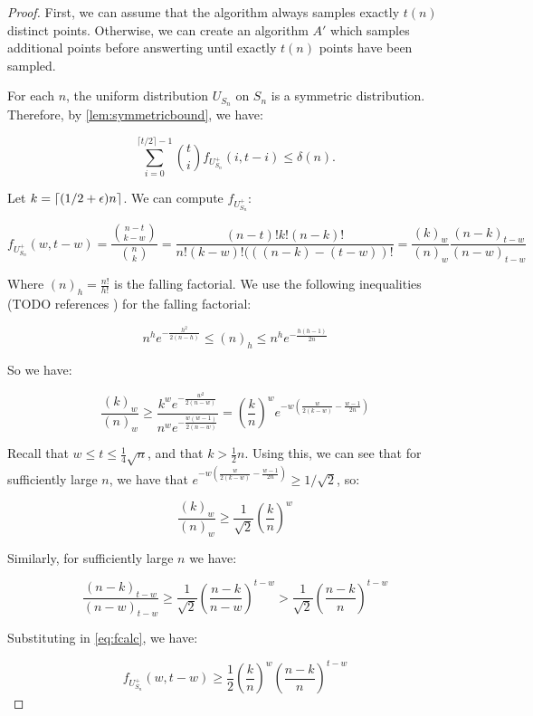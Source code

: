 \begin{proof}

First, we can assume that the algorithm always samples exactly $t(n)$ distinct points. Otherwise,
we can create an algorithm $A'$ which samples additional points before answerting
until exactly $t(n)$ points have been sampled.

For each $n$, the uniform distribution $U_{S_n}$ on $S_n$ is a symmetric distribution. 
Therefore, by \cref{lem:symmetricbound}, we have:

$$
\sum_{i=0}^{\lceil t/2 \rceil-1} \binom{t}{i} f_{U^+_{S_n}}(i, t-i) \leq \delta(n).
$$

Let $k = \lceil(1/2+\epsilon)n\rceil$. We can compute $f_{U^+_{S_n}}$:


\begin{equation}
\label{eq:fcalc}
f_{U^+_{S_n}}(w, t-w) = \frac{\binom{n-t}{k-w}}{\binom{n}{k}} = \frac{(n-t)!k!(n-k)!}{n!(k-w)!(((n-k)-(t-w))!}
    = \frac{(k)_w}{(n)_w} \frac{(n-k)_{t-w}}{(n-w)_{t-w}}
\end{equation}

Where $(n)_h = \frac{n!}{h!}$ is the falling factorial. We use the following inequalities 
(TODO references )
    for the falling
factorial:

$$
n^h e^{-\frac{h^2}{2(n-h)}} \leq (n)_h \leq n^h e^{-\frac{h(h-1)}{2n}}
$$

So we have:

$$
\frac{(k)_w}{(n)_w} \geq \frac{k^we^{-\frac{w^2}{2(n-w)}}}{n^we^{-\frac{w(w-1)}{2(n-w)}}} = \left(\frac{k}{n}\right)^w e^{-w\left(\frac{w}{2(k-w)}-\frac{w-1}{2n}\right)}
$$

Recall that $w \leq t \leq \frac{1}{4}\sqrt{n}$, and that $k > \frac{1}{2}n$. Using this, we can see that for sufficiently large $n$, we have that $e^{-w\left(\frac{w}{2(k-w)}-\frac{w-1}{2n}\right)} \geq 1/\sqrt{2}$, so:

$$
\frac{(k)_w}{(n)_w} \geq \frac{1}{\sqrt{2}}  \left(\frac{k}{n}\right)^w
$$

Similarly, for sufficiently large $n$ we have:

$$
\frac{(n-k)_{t-w}}{(n-w)_{t-w}} \geq \frac{1}{\sqrt{2}} \left(\frac{n-k}{n-w} \right)^{t-w} > \frac{1}{\sqrt{2}} \left(\frac{n-k}{n} \right)^{t-w}
$$

Substituting in \eqref{eq:fcalc}, we have:

$$
f_{U^+_{S_n}}(w, t-w)  \geq \frac{1}{2} \left(\frac{k}{n}\right)^w \left(\frac{n-k}{n} \right)^{t-w}
$$
    

\end{proof}
